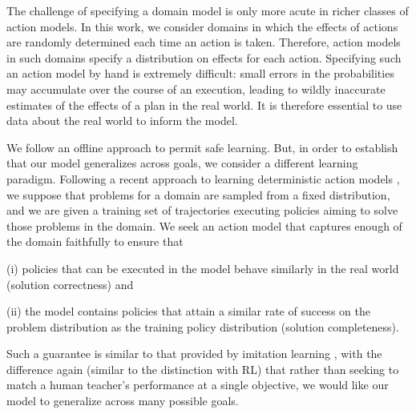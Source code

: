 \documentclass[letterpaper]{article} %
\begin{document}
The challenge of specifying a domain model is only more acute in richer classes of action models. 
In this work, we consider domains in which the effects of actions are randomly determined each time an action is taken. Therefore, action models in such domains specify a distribution on effects for each action. 
Specifying such an action model by hand is extremely difficult: small errors in the probabilities may accumulate over the course of an execution, leading to wildly inaccurate estimates of the effects of a plan in the real world. 
It is therefore essential to use data about the real world to inform the model.



 

We follow an offline approach to permit safe learning. But, in order to establish that our model generalizes across goals, we consider a different learning paradigm. 
Following a recent approach to learning deterministic action models \cite{stern2017efficientAndSafe,juba2021kr}, we suppose that problems for a domain are sampled from a fixed distribution, and we are given a training set of trajectories executing policies aiming to solve those problems in the domain.
We seek an action model that captures enough of the domain faithfully to ensure that
\begin{compactenum}
    \item[(i)] policies that can be executed in the model behave similarly in the real world (solution correctness) and 
    \item[(ii)] the model contains policies that attain a similar rate of success on the problem distribution as the training policy distribution (solution completeness).
\end{compactenum}
Such a guarantee is similar to that provided by imitation learning %
\cite{osa2018algorithmic,khardon1999l2act}, 
with the difference again (similar to the distinction with RL) that rather than seeking to match a human teacher's performance at a single objective, we would like our model to generalize across many possible goals.
\end{document}
